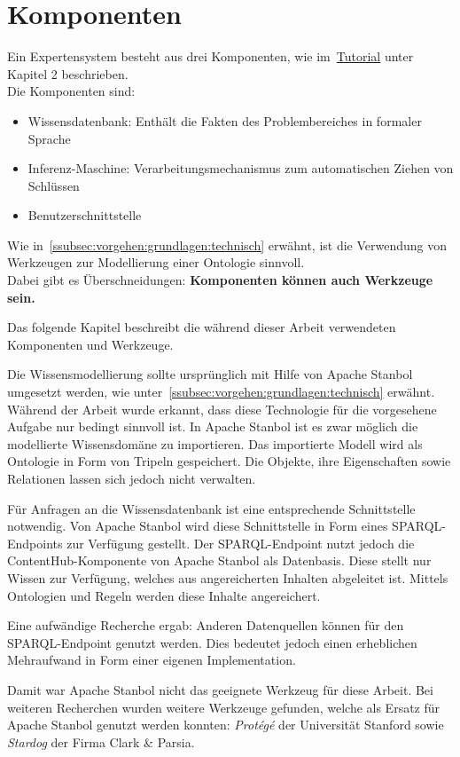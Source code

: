 \chapter{Komponenten}
\label{chap:komponenten}
Ein Expertensystem besteht aus drei Komponenten, wie im~\hyperref[sec:anhang:tutorial_dokument]{Tutorial} unter Kapitel 2 beschrieben.\\
Die Komponenten sind:
\begin{itemize}
    \item Wissensdatenbank: Enthält die Fakten des Problembereiches in formaler Sprache
    \item Inferenz-Maschine: Verarbeitungsmechanismus zum automatischen Ziehen von Schlüssen
    \item Benutzerschnittstelle
\end{itemize}
Wie in~\autoref{ssubsec:vorgehen:grundlagen:technisch} erwähnt, ist die Verwendung von Werkzeugen zur Modellierung einer Ontologie sinnvoll.\\
Dabei gibt es Überschneidungen: \textbf{Komponenten können auch Werkzeuge sein.}

Das folgende Kapitel beschreibt die während dieser Arbeit verwendeten Komponenten und Werkzeuge.

Die Wissensmodellierung sollte ursprünglich mit Hilfe von Apache Stanbol umgesetzt werden, wie unter~\autoref{ssubsec:vorgehen:grundlagen:technisch} erwähnt. Während der Arbeit wurde erkannt, dass diese Technologie für die vorgesehene Aufgabe nur bedingt sinnvoll ist. In Apache Stanbol ist es zwar möglich die modellierte Wissensdomäne zu importieren. Das importierte Modell wird als Ontologie in Form von Tripeln gespeichert. Die Objekte, ihre Eigenschaften sowie Relationen lassen sich jedoch nicht verwalten.

Für Anfragen an die Wissensdatenbank ist eine entsprechende Schnittstelle notwendig. Von Apache Stanbol wird diese Schnittstelle in Form eines SPARQL-Endpoints zur Verfügung gestellt. Der SPARQL-Endpoint nutzt jedoch die ContentHub-Komponente von Apache Stanbol als Datenbasis. Diese stellt nur Wissen zur Verfügung, welches aus angereicherten Inhalten abgeleitet ist. Mittels Ontologien und Regeln werden diese Inhalte angereichert.

Eine aufwändige Recherche ergab: Anderen Datenquellen können für den SPARQL-Endpoint genutzt werden. Dies bedeutet jedoch einen erheblichen Mehraufwand in Form einer eigenen Implementation.

Damit war Apache Stanbol nicht das geeignete Werkzeug für diese Arbeit. Bei weiteren Recherchen wurden weitere Werkzeuge gefunden, welche als Ersatz für Apache Stanbol genutzt werden konnten: \textit{Protégé} der Universität Stanford sowie \textit{Stardog} der Firma Clark \& Parsia.

